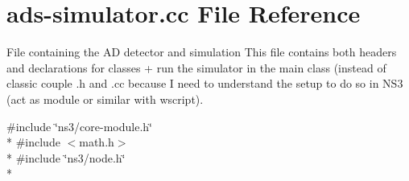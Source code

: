 \hypertarget{ads-simulator_8cc}{}\section{ads-\/simulator.cc File Reference}
\label{ads-simulator_8cc}


File containing the A\+D detector and simulation This file contains both headers and declarations for classes + run the simulator in the main class (instead of classic couple .h and .cc because I need to understand the setup to do so in N\+S3 (act as module or similar with wscript).  


{\ttfamily \#include \char`\"{}ns3/core-\/module.\+h\char`\"{}}\\*
{\ttfamily \#include $<$math.\+h$>$}\\*
{\ttfamily \#include \char`\"{}ns3/node.\+h\char`\"{}}\\*
